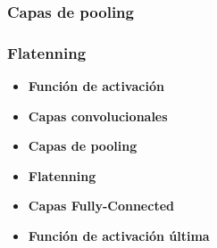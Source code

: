 \subsubsection{Capas de pooling}




\subsubsection{Flatenning}



\begin{itemize}
    \item \textbf{Función de activación}
    \item \textbf{Capas convolucionales}
    \item \textbf{Capas de pooling}
    \item \textbf{Flatenning}
    \item \textbf{Capas Fully-Connected}
    \item \textbf{Función de activación última}
\end{itemize}










